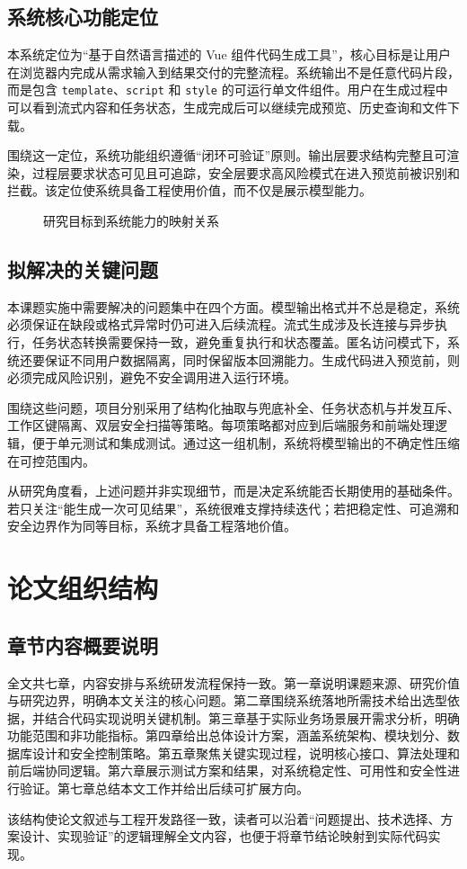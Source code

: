\subsection{系统核心功能定位}
本系统定位为“基于自然语言描述的 Vue 组件代码生成工具”，核心目标是让用户在浏览器内完成从需求输入到结果交付的完整流程。系统输出不是任意代码片段，而是包含 \texttt{template}、\texttt{script} 和 \texttt{style} 的可运行单文件组件。用户在生成过程中可以看到流式内容和任务状态，生成完成后可以继续完成预览、历史查询和文件下载。

围绕这一定位，系统功能组织遵循“闭环可验证”原则。输出层要求结构完整且可渲染，过程层要求状态可见且可追踪，安全层要求高风险模式在进入预览前被识别和拦截。该定位使系统具备工程使用价值，而不仅是展示模型能力。

\begin{figure}[htbp]
\centering
{}
\caption{研究目标到系统能力的映射关系}
\label{fig:chapter1-goal-map}
\end{figure}

\subsection{拟解决的关键问题}
本课题实施中需要解决的问题集中在四个方面。模型输出格式并不总是稳定，系统必须保证在缺段或格式异常时仍可进入后续流程。流式生成涉及长连接与异步执行，任务状态转换需要保持一致，避免重复执行和状态覆盖。匿名访问模式下，系统还要保证不同用户数据隔离，同时保留版本回溯能力。生成代码进入预览前，则必须完成风险识别，避免不安全调用进入运行环境。

围绕这些问题，项目分别采用了结构化抽取与兜底补全、任务状态机与并发互斥、工作区键隔离、双层安全扫描等策略。每项策略都对应到后端服务和前端处理逻辑，便于单元测试和集成测试。通过这一组机制，系统将模型输出的不确定性压缩在可控范围内。

从研究角度看，上述问题并非实现细节，而是决定系统能否长期使用的基础条件。若只关注“能生成一次可见结果”，系统很难支撑持续迭代；若把稳定性、可追溯和安全边界作为同等目标，系统才具备工程落地价值。

\section{论文组织结构}
\subsection{章节内容概要说明}
全文共七章，内容安排与系统研发流程保持一致。第一章说明课题来源、研究价值与研究边界，明确本文关注的核心问题。第二章围绕系统落地所需技术给出选型依据，并结合代码实现说明关键机制。第三章基于实际业务场景展开需求分析，明确功能范围和非功能指标。第四章给出总体设计方案，涵盖系统架构、模块划分、数据库设计和安全控制策略。第五章聚焦关键实现过程，说明核心接口、算法处理和前后端协同逻辑。第六章展示测试方案和结果，对系统稳定性、可用性和安全性进行验证。第七章总结本文工作并给出后续可扩展方向。

该结构使论文叙述与工程开发路径一致，读者可以沿着“问题提出、技术选择、方案设计、实现验证”的逻辑理解全文内容，也便于将章节结论映射到实际代码实现。
